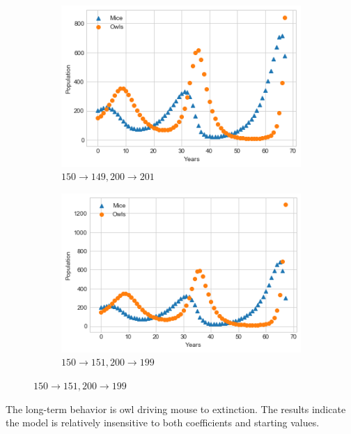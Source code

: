 \documentclass[10pt]{report}
\begin{document}
\begin{enumerate}
\begin{enumerate}[a.]
		\begin{figure}[H]\ContinuedFloat
			\begin{subfigure}[b]{.5\linewidth}
				\caption{$150 \to 149, 200 \to 201$}
				\includegraphics[width=\linewidth]{s1_4/4c3.png}
			\end{subfigure}%
			\begin{subfigure}[b]{.5\linewidth}
				\caption{$150 \to 151, 200 \to 199$}
				\includegraphics[width=\linewidth]{s1_4/4c4.png}
			\end{subfigure}
		\end{figure}
	\end{enumerate}
	The long-term behavior is owl driving mouse to extinction. The results indicate the model is relatively insensitive to both coefficients and starting values.
	
\end{enumerate}
\end{document}

